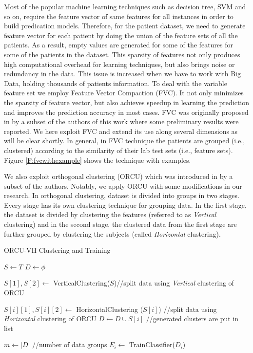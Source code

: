 Most of the popular machine learning techniques such as decision tree, SVM and so on, require the feature vector of same features for all instances in order to build predication models. Therefore, for the patient dataset, we need to generate feature vector for each patient by doing the union of the feature sets of all the patients. As a result, empty values are generated for some of the features for some of the patients in the dataset. This sparsity of features not only produces high computational overhead for learning techniques, but also brings noise or redundancy in the data. This issue is increased when we have to work with Big Data, holding thousands of patients information. To deal with the variable feature set we employ Feature Vector Compaction (FVC). It not only minimizes the sparsity of feature vector, but also achieves speedup in learning the prediction and improves the prediction accuracy in most cases. FVC was originally proposed in \cite{mehedy-masud:2017:fvc} by a subset of the authors of this work where some preliminary results were reported. We here exploit FVC and extend its use along several dimensions as will be clear shortly. In general, in FVC technique the patients are grouped (i.e., clustered) according to the similarity of their lab test sets (i.e., feature sets). Figure \ref{F:fvcwithexample} shows the technique with examples.

We also exploit orthogonal clustering (ORCU) which was introduced in \cite{mehedy-masud:2018:frmwrk} by a subset of the authors. Notably, we apply ORCU with some modifications in our research. In orthogonal clustering, dataset is divided into groups in two stages. Every stage has its own clustering technique for grouping data. In the first stage, the dataset is divided by clustering the features (referred to as \textit{Vertical} clustering) and in the second stage, the clustered data from the first stage are further grouped by clustering the subjects (called \textit{Horizontal} clustering).

\begin{algorithm} 
	\caption{ORCU-VH Clustering and Training} 
	\label{a:ORCU-VH}
	{%
		\begin{algorithmic}[1]  
			\STATE $S \leftarrow T$ 
			\STATE $D \leftarrow \phi$
			
			\STATE $S[1], S[2] \leftarrow$ VerticalClustering($S$)//split data using \textit{Vertical} clustering of ORCU					
			
			\STATE $S[i][1], S[i][2] \leftarrow$ HorizontalClustering ($S[i]$) //split data using \textit{Horizontal} clustering of ORCU
			\STATE $D \leftarrow D \cup S[i]$ //generated clusters are put in list
			\ENDFOR
			
			\STATE $m \leftarrow |D|$ //number of data groups
			\STATE	$E_i \leftarrow $ TrainClassifier($D_i$)
			\ENDFOR    		
		\end{algorithmic}  
	} 
\end{algorithm} 


